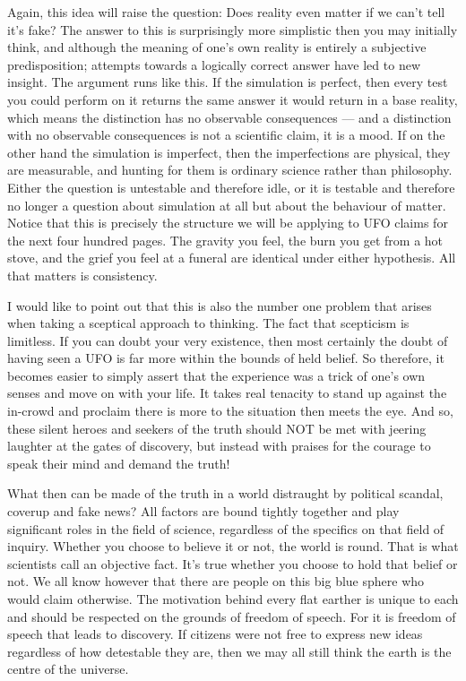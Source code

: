 Again, this idea will raise the question: Does reality even matter if we can't
tell it's fake? The answer to this is surprisingly more simplistic then you may
initially think, and although the meaning of one's own reality is entirely a
subjective predisposition; attempts towards a logically correct answer have led to
new insight. The argument runs like this. If the simulation is perfect, then every test you
could perform on it returns the same answer it would return in a base reality, which means the
distinction has no observable consequences --- and a distinction with no observable consequences is
not a scientific claim, it is a mood. If on the other hand the simulation is imperfect, then the
imperfections are physical, they are measurable, and hunting for them is ordinary science rather
than philosophy. Either the question is untestable and therefore idle, or it is testable and
therefore no longer a question about simulation at all but about the behaviour of matter. Notice
that this is precisely the structure we will be applying to UFO claims for the next four hundred
pages. The gravity you feel, the burn you get from a hot stove, and the grief you feel at a funeral
are identical under either hypothesis. All that matters is
consistency.

I would like to point out that this is also the number one problem that arises
when taking a sceptical approach to thinking. The fact that scepticism is
limitless. If you can doubt your very existence, then most certainly the doubt of
having seen a UFO is far more within the bounds of held belief. So therefore, it
becomes easier to simply assert that the experience was a trick of one's own
senses and move on with your life. It takes real tenacity to stand up against the
in-crowd and proclaim there is more to the situation then meets the eye. And so,
these silent heroes and seekers of the truth should NOT be met with jeering
laughter at the gates of discovery, but instead with praises for the courage to
speak their mind and demand the truth!

What then can be made of the truth in a world distraught by political scandal,
coverup and fake news? All factors are bound tightly together and play significant
roles in the field of science, regardless of the specifics on that field of
inquiry. Whether you choose to believe it or not, the world is round. That is what
scientists call an objective fact. It's true whether you choose to hold that
belief or not. We all know however that there are people on this big blue sphere
who would claim otherwise. The motivation behind every flat earther is unique to
each and should be respected on the grounds of freedom of speech. For it is
freedom of speech that leads to discovery. If citizens were not free to express
new ideas regardless of how detestable they are, then we may all still think the
earth is the centre of the universe.

